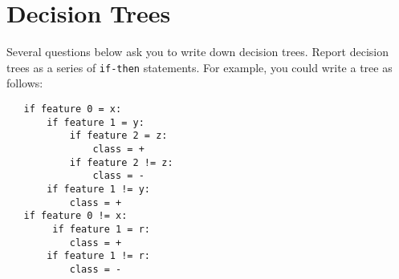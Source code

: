 \section{Decision Trees}
\label{sec:decision-trees}

{\footnotesize Several questions below ask you to write down decision
  trees. Report decision trees as a series of {\tt if-then}
  statements. For example, you could write a tree as follows:
  
\begin{verbatim}
   if feature 0 = x:
       if feature 1 = y:
           if feature 2 = z:
               class = +
           if feature 2 != z:
               class = -
       if feature 1 != y:
           class = +
   if feature 0 != x:
   		if feature 1 = r:
           class = +
       if feature 1 != r:
           class = -
\end{verbatim}
}

